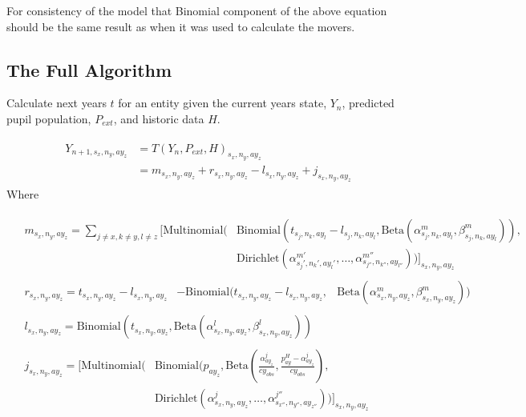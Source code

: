 \documentclass[margin=5mm]{article}
\begin{document}
For consistency of the model that Binomial component of the above
equation should be the same result as when it was used to calculate
the movers.

\subsection{The Full Algorithm}

Calculate next years $t$ for an entity given the current
years state, $Y_n$, predicted pupil population, $P_{ext}$, and
historic data $H$.

\begin{equation*}
  \begin{aligned}
    \begin{split}
      Y_{n+1, s_x,n_y,ay_z} & = T(Y_n,P_{ext}, H)_{s_x,n_y,ay_z} \\
      & = m_{s_x,n_y,ay_z} + r_{s_x,n_y,ay_z} -
l_{s_x,n_y,ay_z} + j_{s_x,n_y,ay_z}
\end{split}
\end{aligned}
\end{equation*}
Where

\begin{equation*}
\begin{aligned}
& \begin{split}
    m_{s_x,n_y,ay_z} = \sum_{j \neq x, k \neq y , l \neq z }\bigg[
        \text{Multinomial}( & \text{Binomial}(t_{s_j,n_k,ay_l} - l_{s_j,n_k,ay_l}, 
        \text{Beta}(\alpha^m_{s_j,n_k,ay_l},\beta^m_{s_j,n_k,ay_l})),
        \\ &  \text{Dirichlet}(\alpha^{m'}_{s_j',n_k',ay_l'}, \dots,
        \alpha^{m''}_{s_{j''},n_{k''},ay_{l''}}))\bigg]_{s_x,n_y,ay_z}
\end{split}\\ 
& \begin{split}
    r_{s_x,n_y,ay_z} = t_{s_x,n_y,ay_z}  - l_{s_x,n_y,ay_z} & - \text{Binomial}(t_{s_x,n_y,ay_z} - l_{s_x,n_y,ay_z}, 
    & \text{Beta}(\alpha^m_{s_x,n_y,ay_z},\beta^m_{s_x,n_y,ay_z})) 
  \end{split}\\
& \begin{split}
  l_{s_x,n_y,ay_z} =
  \text{Binomial}(t_{s_x,n_y,ay_z},\text{Beta}(\alpha^l_{s_x,n_y,ay_z},
  \beta^l_{s_x,n_y,ay_z}))
\end{split}\\
& \begin{split}
j_{s_x,n_y,ay_z} = \bigg[\text{Multinomial}( & \text{Binomial}(p_{ay_z},
\text{Beta}(\frac{\alpha^j_{ay_z}}{cy_{obs}},\frac{p^{H}_{ay} -\alpha^j_{ay_z}}{cy_{obs}}), \\
& \text{Dirichlet}(\alpha^{j}_{s_x,n_y,ay_z}, \dots
, \alpha^{j''}_{s_{x''},n_{y''},ay_{z''}}))\bigg]_{s_x,n_y,ay_z}
\end{split}\\
\end{aligned}
\end{equation*}
\end{document}
